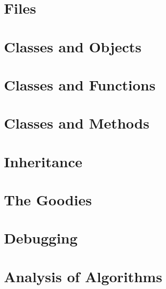 \documentclass[a4paper,11pt]{book}
\begin{document}
\chapter{Files}
\chapter{Classes and Objects}
\chapter{Classes and Functions}
\chapter{Classes and Methods}
\chapter{Inheritance}
\chapter{The Goodies}
\chapter{Debugging}
\chapter{Analysis of Algorithms}
\end{document}
